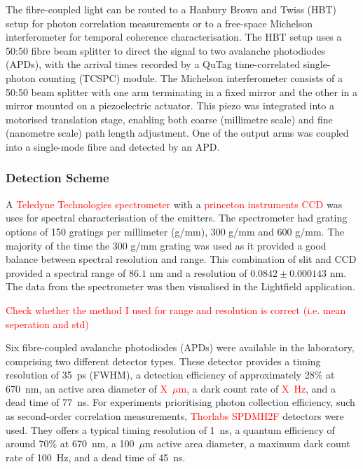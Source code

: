 The fibre-coupled light can be routed to a Hanbury Brown and Twiss (HBT) setup for photon correlation measurements or to a free-space Michelson interferometer for temporal coherence characterisation. The HBT setup uses a 50:50 fibre beam splitter to direct the signal to two avalanche photodiodes (APDs), with the arrival times recorded by a QuTag time-correlated single-photon counting (TCSPC) module. The Michelson interferometer consists of a 50:50 beam splitter with one arm terminating in a fixed mirror and the other in a mirror mounted on a piezoelectric actuator. This piezo was integrated into a motorised translation stage, enabling both coarse (millimetre scale) and fine (nanometre scale) path length adjustment. One of the output arms was coupled into a single-mode fibre and detected by an APD.

\subsubsection{Detection Scheme}

A \textcolor{red}{Teledyne Technologies spectrometer} with a \textcolor{red}{princeton instruments CCD} was uses for spectral characterisation of the emitters. The spectrometer had grating options of 150 gratings per millimeter (g/mm), 300 g/mm and 600 g/mm. The majority of the time the 300 g/mm grating was used as it provided a good balance between spectral resolution and range. This combination of slit and CCD provided a spectral range of $86.1$ nm and a resolution of $0.0842\pm0.000143$ nm. The data from the spectrometer was then visualised in the Lightfield application.

\textcolor{red}{Check whether the method I used for range and resolution is correct (i.e. mean seperation and std)}

Six fibre-coupled avalanche photodiodes (APDs) were available in the laboratory, comprising two different detector types. These detector provides a timing resolution of 35~ps (FWHM), a detection efficiency of approximately 28\% at 670~nm, an active area diameter of \textcolor{red}{X~$\mu$m}, a dark count rate of \textcolor{red}{X~Hz}, and a dead time of 77~ns. For experiments prioritising photon collection efficiency, such as second-order correlation measurements, \textcolor{red}{Thorlabs SPDMH2F} detectors were used. They offers a typical timing resolution of 1~ns, a quantum efficiency of around 70\% at 670~nm, a 100~$\mu$m active area diameter, a maximum dark count rate of 100~Hz, and a dead time of 45~ns.

